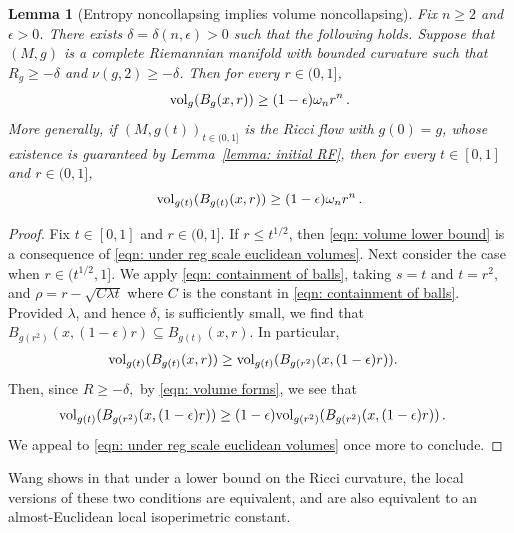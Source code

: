 \documentclass[11pt,reqno]{amsart}
\newtheorem{lemma}[theorem]{Lemma}
\theoremstyle{remark}
\theoremstyle{definition}
\numberwithin{equation}{section}
\newcommand{\e}{{\epsilon}}
\newcommand{\ETA}{{{\lambda}}}
\newcommand{\vol}{{\rm{vol}}}
\begin{document}
\begin{lemma}[Entropy noncollapsing implies volume noncollapsing] 
\label{lemma: volume noncollapsing}Fix $n\geq 2$ and $\e>0$. There exists $\delta =\delta(n,\e)>0$ such that the following holds. 
	Suppose that $(M,g)$ is a complete Riemannian manifold with bounded curvature such that $R_g \geq -\delta$ and $\nu(g, 2)\geq -\delta$. 
	Then for every $r \in (0,1]$,
	\begin{equation}
		\label{eqn: volume lower bound static}
	\vol_{g}(B_{g}(x,r) ) \geq (1-\e) \omega_n r^n\,.
	\end{equation}
More generally, if $(M,g(t))_{t \in(0,1]}$ is the Ricci flow with $g(0)=g$, whose existence is guaranteed by Lemma~\ref{lemma: initial RF}, then for every $t \in [0,1]$ and $r \in (0,1]$,
	\begin{equation}
		\label{eqn: volume lower bound}
	\vol_{g(t)}(B_{g(t)}(x,r) ) \geq (1-\e) \omega_n r^n\,.
	\end{equation}

\end{lemma}
\begin{proof}Fix $t \in [0,1]$ and $r \in (0,1]$.
If $r\leq t^{1/2}$, then \eqref{eqn: volume lower bound} is a  consequence of  \eqref{eqn: under reg scale euclidean volumes}.
Next consider the case when $r \in (t^{1/2}, 1]$. 
We apply \eqref{eqn: containment of balls}, taking $s=t$ and $t=r^2,$ and $\rho =r-\sqrt{C\ETA t}$ where $C$ is the constant in \eqref{eqn: containment of balls}. Provided $\ETA$, and hence $\delta$,  is sufficiently small,  we find that 
$	B_{g(r^2)}(x, (1-\e)r) \subseteq B_{g(t)}(x, r).$
In particular,
\begin{align}\label{eqn: contain b}
	\vol_{g(t)}(B_{g(t)}(x,r)) & \geq \vol_{g(t)}(B_{g(r^2)}(x, (1-\e)r)).
\end{align}
Then, since $R\geq-\delta,$ by \eqref{eqn: volume forms}, we see that 
\begin{align}
	\vol_{g(t)}(B_{g(r^2)}(x, (1-\e)r))& \geq (1-\e)  \vol_{g(r^2)}(B_{g(r^2)}(x, (1-\e)r))\,.
\end{align}
We appeal to \eqref{eqn: under reg scale euclidean volumes} once more to conclude.
\end{proof}
  Wang shows in \cite[Theorem 5.9]{BingWangB} that under a lower bound on the Ricci curvature, the local versions of these two conditions are equivalent, and are also equivalent to an almost-Euclidean local isoperimetric constant. 
\end{document}
